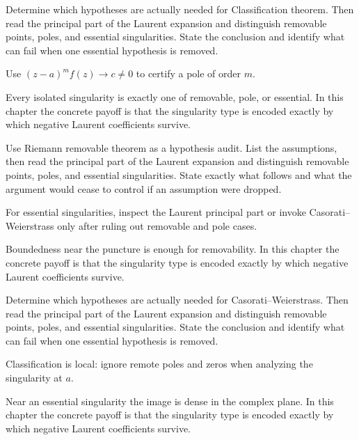 \begin{exercise}\label{exr:iv09-04}
Determine which hypotheses are actually needed for Classification theorem. Then read the principal part of the Laurent expansion and distinguish removable points, poles, and essential singularities. State the conclusion and identify what can fail when one essential hypothesis is removed.
\end{exercise}
\begin{hint}
Use \((z-a)^mf(z)\to c\ne0\) to certify a pole of order \(m\).
\end{hint}
\begin{solution}
Every isolated singularity is exactly one of removable, pole, or essential. In this chapter the concrete payoff is that the singularity type is encoded exactly by which negative Laurent coefficients survive.
\end{solution}

\begin{exercise}\label{exr:iv09-05}
Use Riemann removable theorem as a hypothesis audit. List the assumptions, then read the principal part of the Laurent expansion and distinguish removable points, poles, and essential singularities. State exactly what follows and what the argument would cease to control if an assumption were dropped.
\end{exercise}
\begin{hint}
For essential singularities, inspect the Laurent principal part or invoke Casorati--Weierstrass only after ruling out removable and pole cases.
\end{hint}
\begin{solution}
Boundedness near the puncture is enough for removability. In this chapter the concrete payoff is that the singularity type is encoded exactly by which negative Laurent coefficients survive.
\end{solution}

\begin{exercise}\label{exr:iv09-06}
Determine which hypotheses are actually needed for Casorati--Weierstrass. Then read the principal part of the Laurent expansion and distinguish removable points, poles, and essential singularities. State the conclusion and identify what can fail when one essential hypothesis is removed.
\end{exercise}
\begin{hint}
Classification is local: ignore remote poles and zeros when analyzing the singularity at \(a\).
\end{hint}
\begin{solution}
Near an essential singularity the image is dense in the complex plane. In this chapter the concrete payoff is that the singularity type is encoded exactly by which negative Laurent coefficients survive.
\end{solution}

